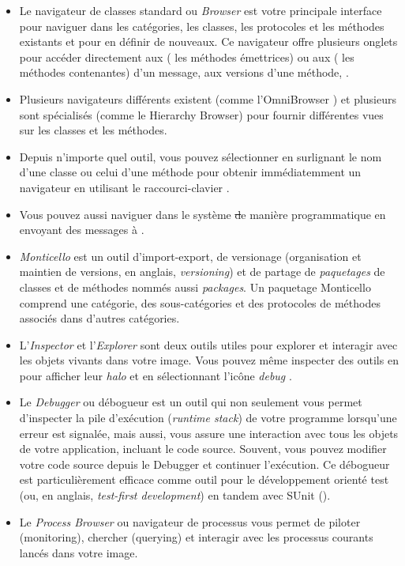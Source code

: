\documentclass[a4paper,10pt,twoside]{book}
\begin{document}
\begin{itemize}
  \item Le navigateur de classes standard ou \emph{Browser} est votre principale interface pour naviguer dans les catégories, les classes, les protocoles et les méthodes existants et pour en définir de nouveaux.
Ce navigateur offre plusieurs onglets pour accéder directement aux \senders (\ie{} les méthodes émettrices) ou aux \implementors (\ie{} les méthodes contenantes) d'un message, aux versions d'une méthode, 
\etc.
  \item Plusieurs navigateurs différents existent
(comme l'OmniBrowser )  
et plusieurs sont spécialisés (comme le Hierarchy Browser) pour fournir différentes vues sur les classes et les méthodes.
  \item Depuis n'importe quel outil, vous pouvez sélectionner en surlignant le nom d'une classe ou celui d'une méthode pour obtenir immédiatemment
un navigateur en utilisant le raccourci-clavier .
  \item Vous pouvez aussi naviguer dans le système \st de manière
programmatique en envoyant des messages à .
  \item \emph{Monticello} est un outil d'import-export, de versionage
    (organisation et maintien de versions, en anglais, \emph{versioning}) et de partage de \emph{paquetages} de classes et de méthodes nommés aussi \emph{packages}.
  Un paquetage Monticello comprend une catégorie, des sous-catégories et des protocoles de méthodes associés dans d'autres catégories. 
  \item L'\emph{Inspector} et l'\emph{Explorer} sont deux outils utiles
pour explorer et interagir avec les objets vivants dans votre image.
Vous pouvez même inspecter des outils en \actclickant{} pour
afficher leur \emph{halo} et en sélectionnant l'icône
\emph{debug} \debugHandle .
  \item Le \emph{Debugger} ou débogueur est un outil qui non seulement vous permet
d'inspecter la pile d'exécution (\emph{runtime stack}) de votre
programme lorsqu'une erreur est signalée, mais aussi, 
vous assure une interaction avec tous les objets de votre application,
incluant le code source. Souvent, vous pouvez modifier votre 
code source depuis le Debugger et continuer l'exécution.
Ce débogueur est particulièrement efficace comme outil pour
le développement orienté test (ou, en anglais, \emph{test-first development}) en tandem
avec 
SUnit ().
  \item Le \emph{Process Browser} ou navigateur de processus vous permet de piloter (monitoring), chercher (querying) et interagir avec les processus courants lancés dans votre image.

\end{itemize}
\end{document}
